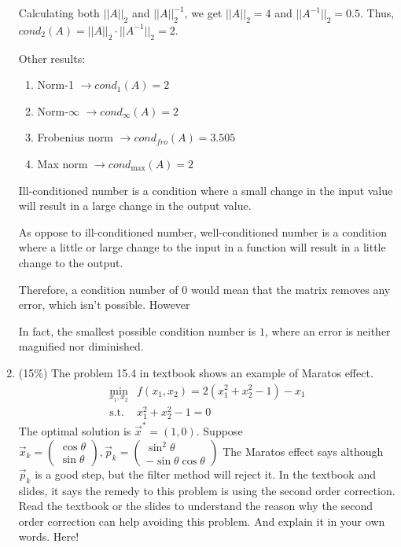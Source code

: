 \documentclass[a4paper,10pt]{article}
\begin{document}
\begin{enumerate}
{Calculating both $||A||_2$ and $||A||^{-1}_2$, we get $||A||_2 = 4$ and $||A^{-1}||_2 = 0.5$.
Thus, $cond_2(A) = ||A||_2 \cdot ||A^{-1}||_2 = 2$.

Other results:
\begin{enumerate}
    \item Norm-1 $\rightarrow cond_1(A) = 2$
    \item Norm-$\infty$ $\rightarrow cond_\infty(A) = 2$
    \item Frobenius norm $\rightarrow cond_{fro}(A) = 3.505$
    \item Max norm $\rightarrow cond_{\max}(A) = 2$   
\end{enumerate}

Ill-conditioned number is a condition where a small change in the input value will result in a large change in the output value.

As oppose to ill-conditioned number, well-conditioned number is a condition where a little or large change to the input in a function will result in a little change to the output.

Therefore, a condition number of $0$ would mean that the matrix removes any error, which isn't possible. However

In fact, the smallest possible condition number is $1$, where an error is neither magnified nor diminished.
}

\item (15\%) The problem 15.4 in textbook shows an example of Maratos effect.
		\begin{align*}
		\min_{x_1, x_2} & f( x_1, x_2 ) = 2( x_1^2 + x_2^2 -1) -x_1\\
		\mbox{s.t. } & x_1^2 + x_2^2 -1=0
		\end{align*}
	The optimal solution is $\vec{x}^* = (1,0)$. Suppose 
	$\vec{x}_k =
		\left(
		\begin{array}{l}
			\cos \theta\\
			\sin \theta
		\end{array} \right),
		\vec{p}_k =
		\left(\begin{array}{c}
			\sin^2 \theta\\
			- \sin \theta \cos \theta
		\end{array} \right)$
	The Maratos effect says although $\vec{p}_k$ is a good step, but the filter method will reject it. In the textbook and slides, 
	it says the remedy to this problem is using the second order correction. Read the textbook or the slides to understand the reason why the second order correction can help avoiding this problem. And explain it in your own words. 
{\color{blue}
Here!
}

\end{enumerate}
\end{document}
